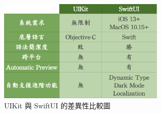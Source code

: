 \documentclass[a4paper,12pt]{article}
\begin{document}
\begin{enumerate}
\begin{figure}[htbp]
\centering
\includegraphics[width=300]{images/differences.png}
\caption{\label{fig:Diff-1}UIKit 與 SwiftUI 的差異性比較圖}
\end{figure}
\end{enumerate}
\end{document}
